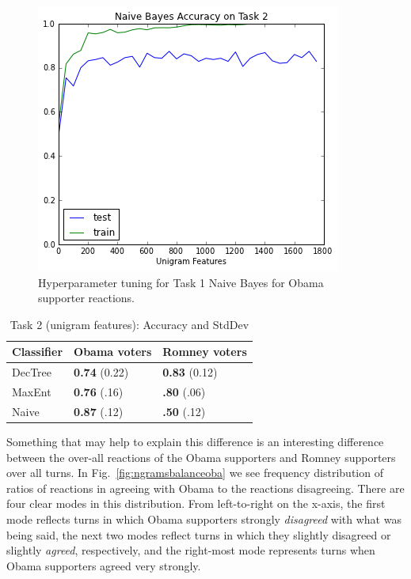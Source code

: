 \begin{figure}[]
	\centering
	\includegraphics[scale=0.60]{Figures/ngrams_hyperparam_task2.png}
	\caption{Hyperparameter tuning for Task 1 Naive Bayes for Obama supporter reactions.}
	\label{fig:ngramstask2hyperparam}
\end{figure}

\begin{table}[]
\begin{centering}
\begin{tabular}{ l | l | l }
Classifier & Obama voters & Romney voters \\
\hline
DecTree & \textbf{0.74} (0.22) &  \textbf{0.83} (0.12) \\
MaxEnt & \textbf{0.76} (.16) &  \textbf{.80} (.06) \\
Naive & \textbf{0.87} (.12) &  \textbf{.50} (.12) \\
\end{tabular}
\caption{Task 2 (unigram features): Accuracy and StdDev}
\label{tab:task2unigrams}
\end{centering}
\end{table}

Something that may help to explain this difference is an interesting difference between the over-all reactions of the Obama supporters and Romney supporters over all turns.  In Fig.~\ref{fig:ngramsbalanceoba} we see frequency distribution of ratios of reactions in agreeing with Obama to the reactions disagreeing.  There are four clear modes in this distribution.  From left-to-right on the x-axis, the first mode reflects turns in which Obama supporters strongly \emph{disagreed} with what was being said, the next two modes reflect turns in which they slightly disagreed or slightly \emph{agreed}, respectively, and the right-most mode represents turns when Obama supporters agreed very strongly.

